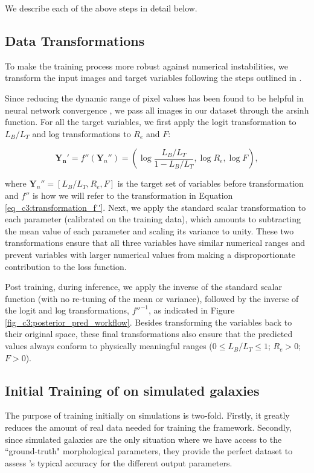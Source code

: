 We describe each of the above steps in detail below. 

\subsection{Data Transformations} \label{sec_c3:transformations}

To make the training process more robust against numerical instabilities, we transform the input images and target variables following the steps outlined in \citet{gampen_software_paper}.

Since reducing the dynamic range of pixel values has been found to be helpful in neural network convergence \citep[e.g.,][]{zanisi_21,walmsley_decals,tanaka_22}, we pass all images in our dataset through the arsinh function. For all the target variables, we first apply the logit transformation to $L_B/L_T$ and log transformations to $R_e$ and $F$: 

\begin{equation}
\boldsymbol{Y_n'} = f''(\boldsymbol{Y}_n'') = \left( \log \frac{L_B/L_T}{1 - L_B/L_T}, \log R_e, \log F \right) ,
\label{eq_c3:transformation_f''}
\end{equation} 

\noindent
where $\boldsymbol{Y}_n'' = [{L_B/L_T,R_e,F}]$ is the target set of variables before transformation and $f''$ is how we will refer to the transformation in Equation\,\ref{eq_c3:transformation_f''}. Next, we apply the standard scalar transformation to each parameter (calibrated on the training data), which amounts to subtracting the mean value of each parameter and scaling its variance to unity. These two transformations ensure that all three variables have similar numerical ranges and prevent variables with larger numerical values from making a disproportionate contribution to the loss function.

Post training, during inference, we apply the inverse of the standard scalar function (with no re-tuning of the mean or variance), followed by the inverse of the logit and log transformations, $f''^{-1}$, as indicated in Figure\,\ref{fig_c3:posterior_pred_workflow}. Besides transforming the variables back to their original space, these final transformations also ensure that the predicted values always conform to physically meaningful ranges ($0 \leq L_B/L_T \leq 1$; $R_e > 0$; $F > 0$).


\subsection{Initial Training of \gampen{} on simulated galaxies} \label{sec_c3:sim_training}
The purpose of training \gampen{} initially on simulations is two-fold. Firstly, it greatly reduces the amount of real data needed for training the framework. Secondly, since simulated galaxies are the only situation where we have access to the ``ground-truth" morphological parameters, they provide the perfect dataset to assess \gampen{}'s typical accuracy for the different output parameters. 

